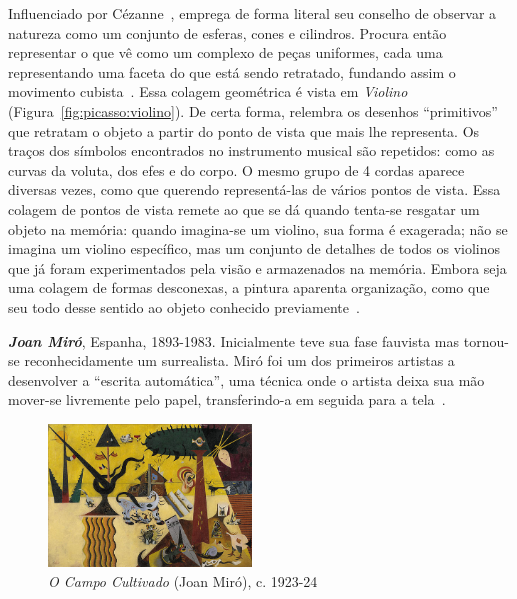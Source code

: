 Influenciado por Cézanne~\cite{rishel}, emprega de forma literal seu
conselho de observar a natureza como um conjunto de esferas, cones e
cilindros. Procura então representar o que vê como um complexo de
peças uniformes, cada uma representando uma faceta do que está sendo
retratado, fundando assim o movimento cubista~\cite{barr,golding}.
Essa colagem geométrica é vista em \emph{Violino}
(Figura~\ref{fig:picasso:violino}). De certa forma, relembra os
desenhos ``primitivos'' que retratam o objeto a partir do ponto de
vista que mais lhe representa. Os traços dos símbolos encontrados no
instrumento musical são repetidos: como as curvas da voluta, dos efes
e do corpo. O mesmo grupo de 4 cordas aparece diversas vezes, como que
querendo representá-las de vários pontos de vista. Essa colagem de
pontos de vista remete ao que se dá quando tenta-se resgatar um objeto
na memória: quando imagina-se um violino, sua forma é exagerada; não
se imagina um violino específico, mas um conjunto de detalhes de todos
os violinos que já foram experimentados pela visão e armazenados na
memória. Embora seja uma colagem de formas desconexas, a pintura
aparenta organização, como que seu todo desse sentido ao objeto
conhecido previamente~\cite{gombrich}.



\textbf{\emph{Joan Miró}}, Espanha, 1893-1983. Inicialmente teve sua fase
fauvista mas tornou-se reconhecidamente um surrealista. Miró foi um dos
primeiros artistas a desenvolver a ``escrita automática'', uma técnica onde o
artista deixa sua mão mover-se livremente pelo papel, transferindo-a em seguida
para a tela~\cite{montagu}. 

\begin{figure}
  \begin{center}
    \includegraphics[width=0.48\textwidth]{figs/miro_campo.png}
  \end{center}
  \caption{\emph{O Campo Cultivado} (Joan Miró), c. 1923-24}
  \label{fig:miro:campo}
\end{figure}


